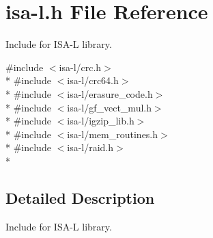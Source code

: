 \hypertarget{isa-l_8h}{\section{isa-\/l.h File Reference}
\label{isa-l_8h}
}


Include for I\-S\-A-\/\-L library.  


{\ttfamily \#include $<$isa-\/l/crc.\-h$>$}\\*
{\ttfamily \#include $<$isa-\/l/crc64.\-h$>$}\\*
{\ttfamily \#include $<$isa-\/l/erasure\-\_\-code.\-h$>$}\\*
{\ttfamily \#include $<$isa-\/l/gf\-\_\-vect\-\_\-mul.\-h$>$}\\*
{\ttfamily \#include $<$isa-\/l/igzip\-\_\-lib.\-h$>$}\\*
{\ttfamily \#include $<$isa-\/l/mem\-\_\-routines.\-h$>$}\\*
{\ttfamily \#include $<$isa-\/l/raid.\-h$>$}\\*


\subsection{Detailed Description}
Include for I\-S\-A-\/\-L library. 